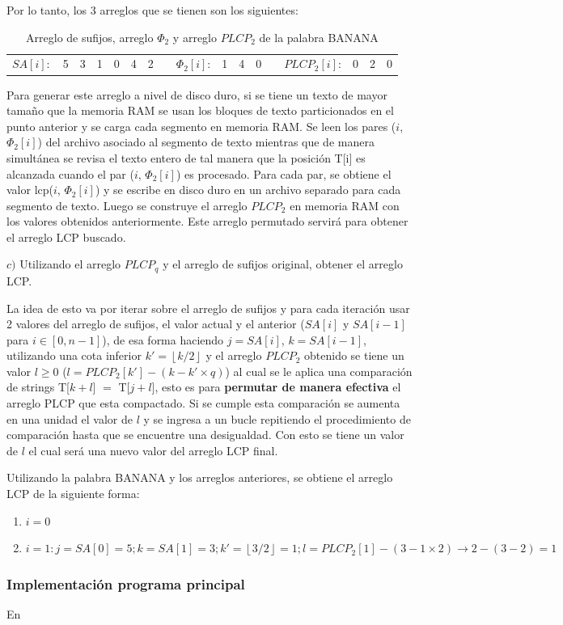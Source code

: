 \newpage

Por lo tanto, los 3 arreglos que se tienen son los siguientes:

\begin{table}[h]
\centering
\begin{tabular}{c|c|c|c|c|c|c|cc|c|c|c|ll|l|l|l|}
\cline{2-7} \cline{10-12} \cline{15-17}
$SA[i]:$ & 5 & 3 & 1 & 0 & 4 & 2 &  & $\Phi_{2}[i]$: & 1 & 4 & 0 &  & $PLCP_{2}[i]$: & 0 & 2 & 0 \\ \cline{2-7} \cline{10-12} \cline{15-17} 
\end{tabular}
\caption{Arreglo de sufijos, arreglo $\Phi_{2}$ y arreglo $PLCP_{2}$ de la palabra BANANA}
\end{table}

Para generar este arreglo a nivel de disco duro, si se tiene un texto de mayor tamaño que la memoria RAM se usan los bloques de texto particionados en el punto anterior y se carga cada segmento en memoria RAM. Se leen los pares ($i$, $\Phi_{2}[i]$) del archivo asociado al segmento de texto mientras que de manera simultánea se revisa el texto entero de tal manera que la posición T[i] es alcanzada cuando el par ($i$, $\Phi_{2}[i]$) es procesado. Para cada par, se obtiene el valor lcp($i$, $\Phi_{2}[i]$) y se escribe en disco duro en un archivo separado para cada segmento de texto. Luego se construye el arreglo $PLCP_{2}$ en memoria RAM con los valores obtenidos anteriormente. Este arreglo permutado servirá para obtener el arreglo LCP buscado.

$c)$ Utilizando el arreglo $PLCP_{q}$ y el arreglo de sufijos original, obtener el arreglo LCP.

La idea de esto va por iterar sobre el arreglo de sufijos y para cada iteración usar 2 valores del arreglo de sufijos, el valor actual y el anterior ($SA[i]$ y $SA[i-1]$ para $i \in [0,n-1]$), de esa forma haciendo $j = SA[i]$, $k = SA[i-1]$, utilizando una cota inferior $k' = \left \lfloor{k/2}\right \rfloor$ y el arreglo $PLCP_{2}$ obtenido se tiene un valor $l \geq 0$ ($l=PLCP_{2}[k']-(k-k' \times q)$) al cual se le aplica una comparación de strings T[$k+l$] $=$ T[$j+l$], esto es para \textbf{permutar de manera efectiva} el arreglo PLCP que esta compactado. Si se cumple esta comparación se aumenta en una unidad el valor de $l$ y se ingresa a un bucle repitiendo el procedimiento de comparación hasta que se encuentre una desigualdad. Con esto se tiene un valor de $l$ el cual será una nuevo valor del arreglo LCP final.

Utilizando la palabra BANANA y los arreglos anteriores, se obtiene el arreglo LCP de la siguiente forma:

\begin{enumerate}

\item $i=0$
\item $i=1: j=SA[0]=5; k=SA[1]=3; k'= \left \lfloor{3/2}\right \rfloor = 1; l= PLCP_{2}[1] - (3-1 \times 2) \rightarrow 2-(3-2)=1$ 

\end{enumerate}


\subsubsection{Implementación programa principal}

En \cite{sascan}